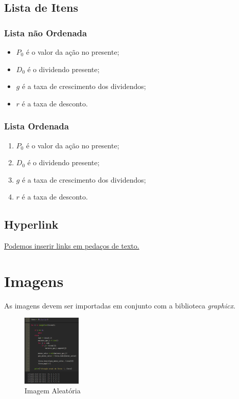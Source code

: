 \documentclass[12pt, a4paper]{article}
\begin{document}
\subsection{Lista de Itens}
\subsubsection{Lista não Ordenada}
\begin{itemize}
    \item $P_{0}$ é o valor da ação no presente;
    \item $D_{0}$ é o dividendo presente;
    \item $g$ é a taxa de crescimento dos dividendos;
    \item $r$ é a taxa de desconto.
\end{itemize}
\subsubsection{Lista Ordenada}

\begin{enumerate}
    \item $P_{0}$ é o valor da ação no presente;
    \item $D_{0}$ é o dividendo presente;
    \item $g$ é a taxa de crescimento dos dividendos;
    \item $r$ é a taxa de desconto.
\end{enumerate}

\subsection{Hyperlink}
\href{https://www.cfainstitute.org/-/media/documents/book/rf-lit-review/2012/rflr-v7-n1-1-pdf.ashx}{Podemos inserir links em pedaços de texto.}

\section{Imagens}
    As imagens devem ser importadas em conjunto com a biblioteca \textit{graphicx}.

\graphicspath{ {images/} } %

\begin{figure}[h]
    \centering
    \includegraphics[scale = 0.35, width = 0.25\textwidth]{Screenshot_22} %
    \caption{Imagem Aleatória}
    \label{script} %
\end{figure}
\end{document}
